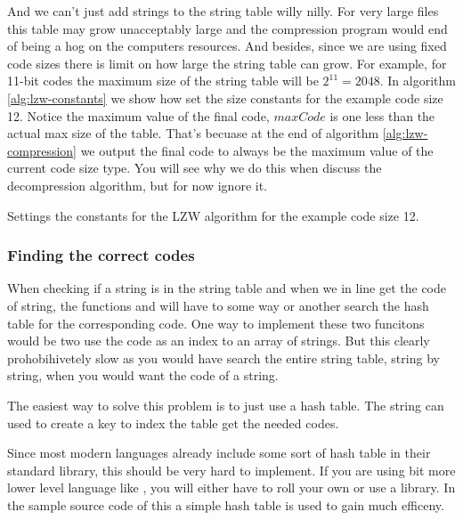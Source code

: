 \begin{refsection}
And we can't just add strings to the string table willy
nilly. For very large files this table may grow unacceptably large and
the compression program would end of being a hog on the computers
resources. And besides, since we are using fixed code sizes there is
limit on how large the string table can grow. For example, for 11-bit
codes the maximum size of the string table will be $2^{11}=2048$. In
algorithm \ref{alg:lzw-constants} we show how set the size constants
for the example code size 12. Notice the maximum value of the final
code, $maxCode$ is one less than the actual max size of the
table. That's becuase at the end of algorithm
\ref{alg:lzw-compression} we output the final code to always be the
maximum value of the current code size type. You will see why we do
this when discuss the decompression algorithm, but for now ignore it.

\begin{algorithm}[H]
  \caption{Settings the constants for the LZW algorithm for the
    example code size 12.}
  \label{alg:lzw-constants}
  \begin{algorithmic}[1]
  \end{algorithmic}
\end{algorithm}

\subsubsection{Finding the correct codes}

When checking if a string is in the string
table  and when
we in line  get the code
of string, the functions  and
 will have to some way or another search the hash
table for the corresponding code. One way to implement these two
funcitons would be two use the code as an index to an array of
strings. But this clearly prohobihivetely slow as you would have
search the entire string table, string by string, when you would want
the code of a string.

The easiest way to solve this problem is to just use a hash table. The
string can used to create a key to index the table get the needed
codes.

Since most modern languages already include some sort of hash table in
their standard library, this should be very hard to implement. If you
are using bit more lower level language like \C, you will either have
to roll your own or use a library. In the sample \C source code of
this a simple hash table is used to gain much efficeny.


\end{refsection}
